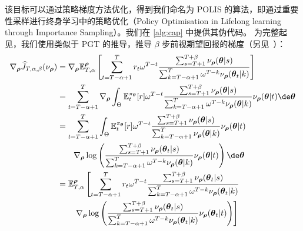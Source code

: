 该目标可以通过策略梯度方法优化，得到我们命名为 POLIS 的算法，即通过重要性采样进行终身学习中的策略优化（Policy Optimisation in Lifelong learning through Importance Sampling）。我们在 \cref{alg:cap} 中提供其伪代码。
为完整起见，我们使用类似于 PGT \cite{williams1992simple} 的推导，推导 $\beta$ 步前视期望回报的梯度（另见~）：
\begin{align*}
    \nabla_{\boldsymbol\rho} \widehat{J}_{T,\alpha,\beta}(\nu_{\boldsymbol\rho})
    &= \nabla_{\boldsymbol\rho} \mathbb{E}^{\boldsymbol\rho}_{T,\alpha} \left[ \sum_{t=T-\alpha+1}^{T} r_t \omega^{T-t} \frac{\sum_{s=T+1}^{T+\beta} \nu_{\boldsymbol\rho}(\boldsymbol\theta\vert s)}{\sum_{k=T-\alpha+1}^{T}\omega^{T-k} \nu_{\boldsymbol\rho} (\boldsymbol\theta_t \vert k)}\right]
    \\
    &= \sum_{t=T-\alpha+1}^{T} \nabla_{\boldsymbol\rho} \int_{\Theta}  \mathbb{E}_{t}^{\pi_{\boldsymbol\theta}}[r] \omega^{T-t} \frac{\sum_{s=T+1}^{T+\beta} \nu_{\boldsymbol\rho}(\boldsymbol\theta\vert s)}{\sum_{k=T-\alpha+1}^{T}\omega^{T-k}\nu_{\boldsymbol\rho} (\boldsymbol\theta \vert k)}  \nu_{\boldsymbol\rho} (\boldsymbol\theta \vert t)\de\boldsymbol\theta
    \\
    &=  \sum_{t=T-\alpha+1}^{T} \int_{\Theta}   \mathbb{E}_{t}^{\pi_{\boldsymbol\theta}}[r] \omega^{T-t} \frac{\sum_{s=T+1}^{T+\beta} \nu_{\boldsymbol\rho}(\boldsymbol\theta\vert s)}{\sum_{k=T-\alpha+1}^{T}\nu_{\boldsymbol\rho} (\boldsymbol\theta \vert k)}  \nu_{\boldsymbol\rho} (\boldsymbol\theta \vert t)
    \\
    &\qquad \nabla_{\boldsymbol\rho}  \log\left( \frac{\sum_{s=T+1}^{T+\beta} \nu_{\boldsymbol\rho}(\boldsymbol\theta_t\vert s)}{\sum_{k=T-\alpha+1}^{T}\omega^{T-k}\nu_{\boldsymbol\rho} (\boldsymbol\theta \vert k)}  \nu_{\boldsymbol\rho} (\boldsymbol\theta \vert t) \right) \de\boldsymbol\theta
    \\
    &= \mathbb{E}^{\boldsymbol\rho}_{T,\alpha}\left[  \sum_{t=T-\alpha+1}^{T} r_t \omega^{T-t} \frac{\sum_{s=T+1}^{T+\beta} \nu_{\boldsymbol\rho}(\boldsymbol\theta_t\vert s)}{\sum_{k=T-\alpha+1}^{T}\omega^{T-k}\nu_{\boldsymbol\rho} (\boldsymbol\theta_t \vert k)} \right.
    \\
    &\qquad \left.\nabla_{\boldsymbol\rho} \log \left( \frac{\sum_{s=T+1}^{T+\beta} \nu_{\boldsymbol\rho}(\boldsymbol\theta_t\vert s)}{\sum_{k=T-\alpha+1}^{T}\omega^{T-k}\nu_{\boldsymbol\rho} (\boldsymbol\theta_t \vert k)}  \nu_{\boldsymbol\rho} (\boldsymbol\theta_t \vert t) \right)\right]
\end{align*}


